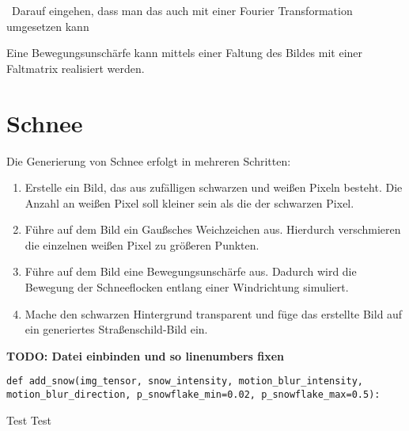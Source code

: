 ~Darauf eingehen, dass man das auch mit einer Fourier Transformation umgesetzen kann~

Eine Bewegungsunschärfe kann mittels einer Faltung des Bildes mit einer Faltmatrix realisiert werden.
\section{Schnee}
Die Generierung von Schnee erfolgt in mehreren Schritten:
\begin{enumerate}
  \item Erstelle ein Bild, das aus zufälligen schwarzen und weißen Pixeln besteht. Die Anzahl an weißen Pixel soll kleiner sein als die der schwarzen Pixel.
  \item Führe auf dem Bild ein Gaußsches Weichzeichen aus. Hierdurch verschmieren die einzelnen weißen Pixel zu größeren Punkten.
  \item Führe auf dem Bild eine Bewegungsunschärfe aus. Dadurch wird die Bewegung der Schneeflocken entlang einer Windrichtung simuliert.
  \item Mache den schwarzen Hintergrund transparent und füge das erstellte Bild auf ein generiertes Straßenschild-Bild ein.
\end{enumerate}

\textbf{TODO: Datei einbinden und so linenumbers fixen}
\begin{code}
\label{code:snow-delcaration}
\begin{verbatim}
def add_snow(img_tensor, snow_intensity, motion_blur_intensity, motion_blur_direction, p_snowflake_min=0.02, p_snowflake_max=0.5):
\end{verbatim}
\end{code}

Test Test